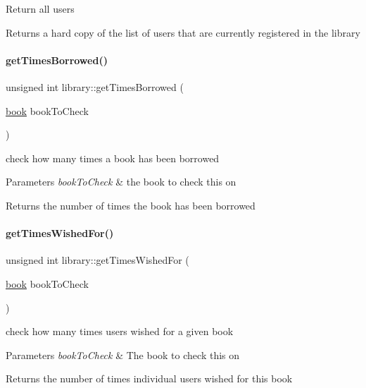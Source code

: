 Return all users

\begin{DoxyReturn}{Returns}
a hard copy of the list of users that are currently registered in the library 
\end{DoxyReturn}
\mbox{\label{classlibrary_a297c4813872bbba3f8088a4acc3f7b6d}} 
\paragraph{\texorpdfstring{get\+Times\+Borrowed()}{getTimesBorrowed()}}
{\footnotesize\ttfamily unsigned int library\+::get\+Times\+Borrowed (\begin{DoxyParamCaption}\item[{\hyperlink{classbook}{book}}]{book\+To\+Check }\end{DoxyParamCaption})}

check how many times a book has been borrowed


\begin{DoxyParams}{Parameters}
{\em book\+To\+Check} & the book to check this on \\
\hline
\end{DoxyParams}
\begin{DoxyReturn}{Returns}
the number of times the book has been borrowed 
\end{DoxyReturn}
\mbox{\label{classlibrary_ae6b0c037908e328dcf3a9dfb946ed5f2}} 
\paragraph{\texorpdfstring{get\+Times\+Wished\+For()}{getTimesWishedFor()}}
{\footnotesize\ttfamily unsigned int library\+::get\+Times\+Wished\+For (\begin{DoxyParamCaption}\item[{\hyperlink{classbook}{book}}]{book\+To\+Check }\end{DoxyParamCaption})}

check how many times users wished for a given book


\begin{DoxyParams}{Parameters}
{\em book\+To\+Check} & The book to check this on \\
\hline
\end{DoxyParams}
\begin{DoxyReturn}{Returns}
the number of times individual users wished for this book 
\end{DoxyReturn}
\mbox{\label{classlibrary_a6c3bdf1f2614b6b7459ebcc898f8636f}} 
